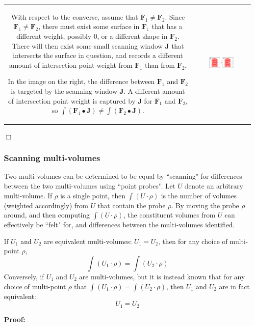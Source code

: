 \begin{tabular}{cc}
\parbox{0.5\textwidth}{
With respect to the converse, assume that \(\mathbf{F}_1 \neq \mathbf{F}_2\). Since \(\mathbf{F}_1 \neq \mathbf{F}_2\), there must exist some surface in \(\mathbf{F}_1\) that has a different weight, possibly \(0\), or a different shape in \(\mathbf{F}_2\). There will then exist some small scanning window \(\mathbf{J}\) that intersects the surface in question, and records a different amount of intersection point weight from \(\mathbf{F}_1\) than from \(\mathbf{F}_2\).

In the image on the right, the difference between \(\mathbf{F}_1\) and \(\mathbf{F}_2\) is targeted by the scanning window \(\mathbf{J}\). A different amount of intersection point weight is captured by \(\mathbf{J}\) for \(\mathbf{F}_1\) and \(\mathbf{F}_2\), so \(\int (\mathbf{F}_1 \bullet \mathbf{J}) \neq \int (\mathbf{F}_2 \bullet \mathbf{J})\).
} & \parbox{0.5\textwidth}{
\includegraphics[width = 0.5\textwidth]{Point_totals/scanning_surfaces_using_paths}
}
\end{tabular}

\(\Box\)

\subsubsection{Scanning multi-volumes}

Two multi-volumes can be determined to be equal by ``scanning" for differences between the two multi-volumes using ``point probes". Let \(U\) denote an arbitrary multi-volume. If \(\rho\) is a single point, then \(\int (U \cdot \rho)\) is the number of volumes (weighted accordingly) from \(U\) that contain the probe \(\rho\). By moving the probe \(\rho\) around, and then computing \(\int (U \cdot \rho)\), the constituent volumes from \(U\) can effectively be ``felt" for, and differences between the multi-volumes identified.  

\begin{thm}
If \(U_1\) and \(U_2\) are equivalent multi-volumes: \(U_1 = U_2\), then for any choice of multi-point \(\rho\), 
\[\int (U_1 \cdot \rho) = \int (U_2 \cdot \rho)\]
Conversely, if \(U_1\) and \(U_2\) are multi-volumes, but it is instead known that for any choice of multi-point \(\rho\) that 
\(\int (U_1 \cdot \rho) = \int (U_2 \cdot \rho)\), then \(U_1\) and \(U_2\) are in fact equivalent:
\[U_1 = U_2\]  
\end{thm}
\textbf{Proof:}

